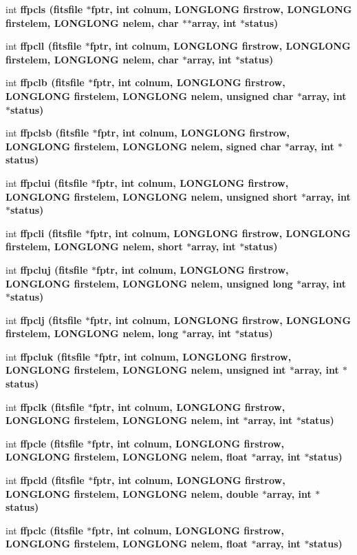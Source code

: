 \begin{CompactItemize}
int \bf{ffpcls} (\bf{fitsfile} $\ast$fptr, int colnum, \bf{LONGLONG} firstrow, \bf{LONGLONG} firstelem, \bf{LONGLONG} nelem, char $\ast$$\ast$array, int $\ast$status)
\item 
int \bf{ffpcll} (\bf{fitsfile} $\ast$fptr, int colnum, \bf{LONGLONG} firstrow, \bf{LONGLONG} firstelem, \bf{LONGLONG} nelem, char $\ast$array, int $\ast$status)
\item 
int \bf{ffpclb} (\bf{fitsfile} $\ast$fptr, int colnum, \bf{LONGLONG} firstrow, \bf{LONGLONG} firstelem, \bf{LONGLONG} nelem, unsigned char $\ast$array, int $\ast$status)
\item 
int \bf{ffpclsb} (\bf{fitsfile} $\ast$fptr, int colnum, \bf{LONGLONG} firstrow, \bf{LONGLONG} firstelem, \bf{LONGLONG} nelem, signed char $\ast$array, int $\ast$status)
\item 
int \bf{ffpclui} (\bf{fitsfile} $\ast$fptr, int colnum, \bf{LONGLONG} firstrow, \bf{LONGLONG} firstelem, \bf{LONGLONG} nelem, unsigned short $\ast$array, int $\ast$status)
\item 
int \bf{ffpcli} (\bf{fitsfile} $\ast$fptr, int colnum, \bf{LONGLONG} firstrow, \bf{LONGLONG} firstelem, \bf{LONGLONG} nelem, short $\ast$array, int $\ast$status)
\item 
int \bf{ffpcluj} (\bf{fitsfile} $\ast$fptr, int colnum, \bf{LONGLONG} firstrow, \bf{LONGLONG} firstelem, \bf{LONGLONG} nelem, unsigned long $\ast$array, int $\ast$status)
\item 
int \bf{ffpclj} (\bf{fitsfile} $\ast$fptr, int colnum, \bf{LONGLONG} firstrow, \bf{LONGLONG} firstelem, \bf{LONGLONG} nelem, long $\ast$array, int $\ast$status)
\item 
int \bf{ffpcluk} (\bf{fitsfile} $\ast$fptr, int colnum, \bf{LONGLONG} firstrow, \bf{LONGLONG} firstelem, \bf{LONGLONG} nelem, unsigned int $\ast$array, int $\ast$status)
\item 
int \bf{ffpclk} (\bf{fitsfile} $\ast$fptr, int colnum, \bf{LONGLONG} firstrow, \bf{LONGLONG} firstelem, \bf{LONGLONG} nelem, int $\ast$array, int $\ast$status)
\item 
int \bf{ffpcle} (\bf{fitsfile} $\ast$fptr, int colnum, \bf{LONGLONG} firstrow, \bf{LONGLONG} firstelem, \bf{LONGLONG} nelem, float $\ast$array, int $\ast$status)
\item 
int \bf{ffpcld} (\bf{fitsfile} $\ast$fptr, int colnum, \bf{LONGLONG} firstrow, \bf{LONGLONG} firstelem, \bf{LONGLONG} nelem, double $\ast$array, int $\ast$status)
\item 
int \bf{ffpclc} (\bf{fitsfile} $\ast$fptr, int colnum, \bf{LONGLONG} firstrow, \bf{LONGLONG} firstelem, \bf{LONGLONG} nelem, float $\ast$array, int $\ast$status)
$$
\end{CompactItemize}

